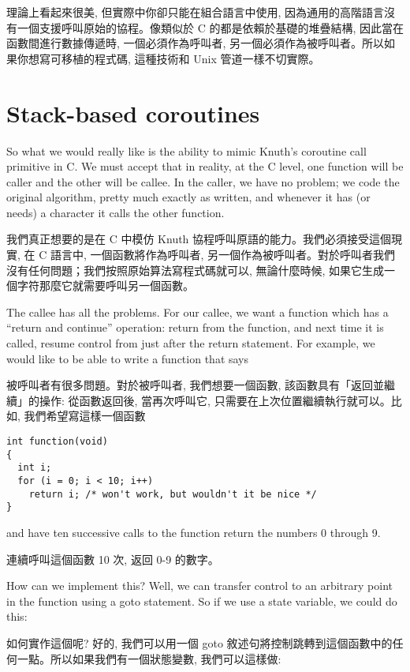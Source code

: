 \documentclass[12pt]{article}
\begin{document}
\begin{CJK}{UTF8}{bsmi}
理論上看起來很美, 但實際中你卻只能在組合語言中使用, 因為通用的高階語言沒有一個支援呼叫原始的協程。像類似於 C 的都是依賴於基礎的堆疊結構, 因此當在函數間進行數據傳遞時, 一個必須作為呼叫者, 另一個必須作為被呼叫者。所以如果你想寫可移植的程式碼, 這種技術和 Unix 管道一樣不切實際。

\section{Stack-based coroutines}

So what we would really like is the ability to mimic Knuth's coroutine call primitive in C. We must accept that in reality, at the C level, one function will be caller and the other will be callee. In the caller, we have no problem; we code the original algorithm, pretty much exactly as written, and whenever it has (or needs) a character it calls the other function.

我們真正想要的是在 C 中模仿 Knuth 協程呼叫原語的能力。我們必須接受這個現實, 在 C 語言中, 一個函數將作為呼叫者, 另一個作為被呼叫者。對於呼叫者我們沒有任何問題；我們按照原始算法寫程式碼就可以, 無論什麼時候, 如果它生成一個字符那麼它就需要呼叫另一個函數。

The callee has all the problems. For our callee, we want a function which has a ``return and continue'' operation: return from the function, and next time it is called, resume control from just after the return statement. For example, we would like to be able to write a function that says


 被呼叫者有很多問題。對於被呼叫者, 我們想要一個函數, 該函數具有「返回並繼續」的操作: 從函數返回後, 當再次呼叫它, 只需要在上次位置繼續執行就可以。比如, 我們希望寫這樣一個函數 

\begin{lstlisting}[basicstyle=\footnotesize, breaklines=true]
int function(void) 
{
  int i;
  for (i = 0; i < 10; i++)
    return i; /* won't work, but wouldn't it be nice */
}
\end{lstlisting}

and have ten successive calls to the function return the numbers 0 through 9.

連續呼叫這個函數 10 次, 返回 0-9 的數字。 

How can we implement this? Well, we can transfer control to an arbitrary point in the function using a goto statement. So if we use a state variable, we could do this:

如何實作這個呢? 好的, 我們可以用一個 goto 敘述句將控制跳轉到這個函數中的任何一點。所以如果我們有一個狀態變數, 我們可以這樣做:


\end{CJK}
\end{document}
